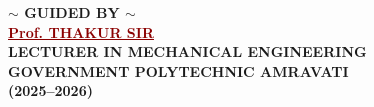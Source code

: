 \begin{center}
  {\fontsize{11}{14}\selectfont \bfseries $\sim$ GUIDED BY $\sim$}\\[2.5mm]
  {\fontsize{13}{16}\selectfont \bfseries \textcolor{darkred}{\underline{Prof. THAKUR SIR}}}\\[1.5mm]
  {\fontsize{10}{13}\selectfont \bfseries LECTURER IN MECHANICAL ENGINEERING}\\[1mm]
  {\fontsize{10}{13}\selectfont \bfseries GOVERNMENT POLYTECHNIC AMRAVATI}\\[1.5mm]
  {\fontsize{10}{13}\selectfont \bfseries (2025--2026)}
\end{center}
\clearpage
